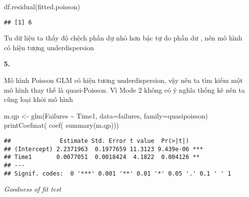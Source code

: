 \documentclass[
]{article}
\newenvironment{Shaded}{\begin{snugshade}}{\end{snugshade}}
\newcommand{\AttributeTok}[1]{\textcolor[rgb]{0.77,0.63,0.00}{#1}}
\newcommand{\FunctionTok}[1]{\textcolor[rgb]{0.00,0.00,0.00}{#1}}
\newcommand{\NormalTok}[1]{#1}
\newcommand{\OtherTok}[1]{\textcolor[rgb]{0.56,0.35,0.01}{#1}}
\newcommand{\SpecialCharTok}[1]{\textcolor[rgb]{0.00,0.00,0.00}{#1}}
\begin{document}
\begin{Shaded}
\begin{Highlighting}[]
\FunctionTok{df.residual}\NormalTok{(fitted.poisson)}
\end{Highlighting}
\end{Shaded}

\begin{verbatim}
## [1] 6
\end{verbatim}

Tu dữ liệu ta thấy độ chệch phần dự nhỏ hơn bậc tự do phần dư , nên mô
hình có hiện tượng underdispersion

\textbf{5.}

Mô hình Poisson GLM có hiện tương underdispersion, vậy nên ta tìm kiếm
một mô hình thay thế là quasi-Poisson. Vì Mode 2 không có ý nghĩa thống
kê nên ta cũng loại khỏi mô hình

\begin{Shaded}
\begin{Highlighting}[]
\NormalTok{m.qp }\OtherTok{\textless{}{-}} \FunctionTok{glm}\NormalTok{(Failures }\SpecialCharTok{\textasciitilde{}}\NormalTok{ Time1, }\AttributeTok{data=}\NormalTok{failures, }\AttributeTok{family=}\NormalTok{quasipoisson)}
\FunctionTok{printCoefmat}\NormalTok{( }\FunctionTok{coef}\NormalTok{( }\FunctionTok{summary}\NormalTok{(m.qp)))}
\end{Highlighting}
\end{Shaded}

\begin{verbatim}
##              Estimate Std. Error t value  Pr(>|t|)    
## (Intercept) 2.2371963  0.1977659 11.3123 9.439e-06 ***
## Time1       0.0077051  0.0018424  4.1822  0.004126 ** 
## ---
## Signif. codes:  0 '***' 0.001 '**' 0.01 '*' 0.05 '.' 0.1 ' ' 1
\end{verbatim}

\emph{Goodness of fit test }
\end{document}
